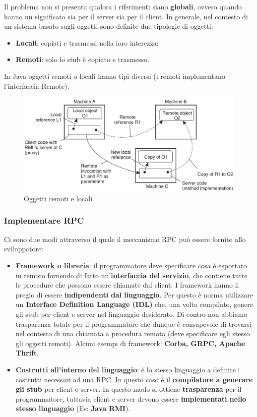 \documentclass[12pt]{article}
\begin{document}
			Il problema non si presenta qualora i riferimenti siano \textbf{globali}, ovvero quando hanno un significato sia per il server sia per il client. \newline
			In generale, nel contesto di un sistema basato sugli oggetti sono definite due tipologie di oggetti:
			\begin{itemize}
				\item \textbf{Locali}: copiati e trasmessi nella loro interezza;
				\item \textbf{Remoti}: solo lo stub è copiato e trasmesso. 
			\end{itemize}
			In Java oggetti remoti o locali hanno tipi diversi (i remoti implementano l'interfaccia Remote).
			\begin{figure}[h!]
				\centering
				\includegraphics[scale=0.25]{img/remotelocal.png}
				\caption{Oggetti remoti e locali  }
			\end{figure}
		
		\subsubsection{Implementare RPC}
			Ci sono due modi attraverso il quale il meccanismo RPC può essere fornito allo sviluppatore:
			\begin{itemize}
				\item \textbf{Framework o libreria}: il programmatore deve specificare cosa è esportato in remoto fornendo di fatto un'\textbf{interfaccia del servizio}, che contiene tutte le procedure che possono essere chiamate dal client. I framework hanno il pregio di essere \textbf{indipendenti dal linguaggio}. Per questo è norma utilizzare un \textbf{Interface Definition Language (IDL)} che, una volta compilato, genere gli stub per client e server nel linguaggio desiderato. Di contro non abbiamo trasparenza totale per il programmatore che dunque è consapevole di trovarsi nel contesto di una chiamata a procedura remota (deve specificare egli stesso gli oggetti remoti). Alcuni esempi di framework: \textbf{Corba, GRPC, Apache Thrift}.     
				\item \textbf{Costrutti all'interno del linguaggio}: è lo stesso linguaggio a definire i costrutti necessari ad una RPC. In questo caso è il \textbf{compilatore a generare gli stub} per client e server. In questo modo si ottiene \textbf{trasparenza} per il programmatore, tuttavia client e server devono essere \textbf{implementati nello stesso linguaggio} (Es: \textbf{Java RMI}).
			\end{itemize}
		
\end{document}
